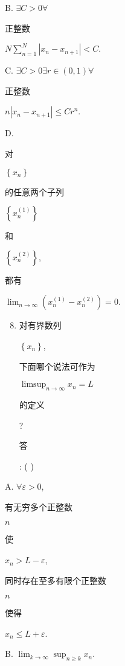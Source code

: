 \documentclass[10pt]{article}
\begin{document}
B. $\exists C>0 \forall$ \begin{CJK}{UTF8}{mj}正整数\end{CJK} $N \sum_{n=1}^{N}\left|x_{n}-x_{n+1}\right|<C$.

C. $\exists C>0 \exists r \in(0,1) \forall$ \begin{CJK}{UTF8}{mj}正整数\end{CJK} $n\left|x_{n}-x_{n+1}\right| \leqslant C r^{n}$.

D. \begin{CJK}{UTF8}{mj}对\end{CJK} $\left\{x_{n}\right\}$ \begin{CJK}{UTF8}{mj}的任意两个子列\end{CJK} $\left\{x_{n}^{(1)}\right\}$ \begin{CJK}{UTF8}{mj}和\end{CJK} $\left\{x_{n}^{(2)}\right\}$, \begin{CJK}{UTF8}{mj}都有\end{CJK} $\lim _{n \rightarrow \infty}\left(x_{n}^{(1)}-x_{n}^{(2)}\right)=0$.

\begin{enumerate}
  \setcounter{enumi}{7}
  \item \begin{CJK}{UTF8}{mj}对有界数列\end{CJK} $\left\{x_{n}\right\}$, \begin{CJK}{UTF8}{mj}下面哪个说法可作为\end{CJK} $\limsup _{n \rightarrow \infty} x_{n}=L$ \begin{CJK}{UTF8}{mj}的定义\end{CJK}? \begin{CJK}{UTF8}{mj}答\end{CJK}: ( )
\end{enumerate}
A. $\forall \varepsilon>0$, \begin{CJK}{UTF8}{mj}有无穷多个正整数\end{CJK} $n$ \begin{CJK}{UTF8}{mj}使\end{CJK} $x_{n}>L-\varepsilon$, \begin{CJK}{UTF8}{mj}同时存在至多有限个正整数\end{CJK} $n$ \begin{CJK}{UTF8}{mj}使得\end{CJK} $x_{n} \leqslant L+\varepsilon$.

B. $\lim _{k \rightarrow \infty} \sup _{n \geqslant k} x_{n}$.
\end{document}
